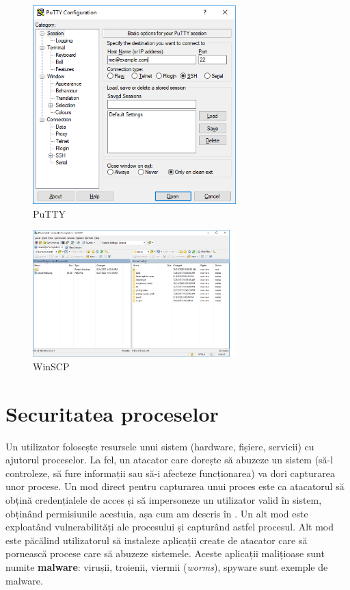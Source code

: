 \begin{figure}[!htbp]
  \centering
  \includegraphics[width=0.7\textwidth]{chapters/12-sec/img/putty.png}
  \caption{PuTTY}
  \label{fig:sec:putty}
\end{figure}

\begin{figure}[!htbp]
  \centering
  \includegraphics[width=0.7\textwidth]{chapters/12-sec/img/winscp.png}
  \caption{WinSCP}
  \label{fig:sec:winscp}
\end{figure}

\section{Securitatea proceselor}
\label{sec:sec:process}

Un utilizator folosește resursele unui sistem (hardware, fișiere, servicii) cu ajutorul proceselor.
La fel, un atacator care dorește să abuzeze un sistem (să-l controleze, să fure informații sau să-i afecteze funcționarea) va dori capturarea unor procese.
Un mod direct pentru capturarea unui proces este ca atacatorul să obțină credențialele de acces și să impersoneze un utilizator valid în sistem, obținând permisiunile acestuia, așa cum am descris în .
Un alt mod este exploatând vulnerabilități ale procesului și capturând astfel procesul.
Alt mod este păcălind utilizatorul să instaleze aplicații create de atacator care să pornească procese care să abuzeze sistemele.
Aceste aplicații malițioase sunt numite \textbf{malware}: virușii, troienii, viermii (\textit{worms}), spyware sunt exemple de malware.

